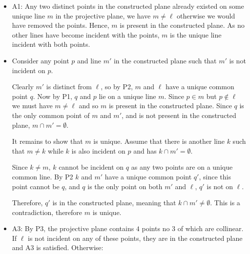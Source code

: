 \documentclass[a4paper, 11pt]{article}
\begin{document}
\begin{itemize}
	\item
		 A1: Any two distinct points in the constructed plane already existed on some unique line $m$ in the projective plane, we have $m\neq\ell$ otherwise we would have removed the points. Hence, $m$ is present in the constructed plane. As no other lines have become incident with the points, $m$ is the unique line incident with both points.  

	\item 
		Consider any point $p$ and line $m'$ in the constructed plane such that $m'$ is not incident on $p$. 

		Clearly $m'$ is distinct from $\ell$, so by P2, $m$ and $\ell$ have a unique common point $q$. Now by P1, $q$ and $p$ lie on a unique line $m$. Since $p\in m$ but $p\notin\ell$ we must have $m\neq\ell$ and so $m$ is present in the constructed plane. Since $q$ is the only common point of $m$ and $m'$, and is not present in the constructed plane, $m\cap m'=\emptyset$. 

		\begin{center}
		\end{center}

		It remains to show that $m$ is unique. Assume that there is another line $k$ such that $m\neq k$ while $k$ is also incident on $p$ and has $k\cap m'=\emptyset$.

		Since $k\neq m$, $k$ cannot be incident on $q$ as any two points are on a unique common line. By P2 $k$ and $m'$ have a unique common point $q'$, since this point cannot be $q$, and $q$ is the only point on both $m'$ and $\ell$, $q'$ is not on $\ell$. 

		Therefore, $q'$ is in the constructed plane, meaning that $k\cap m'\neq \emptyset$. This is a contradiction, therefore $m$ is unique. 
\pagebreak
	\item 
		A3: By P3, the projective plane contains $4$ points no $3$ of which are collinear. If $\ell$ is not incident on any of these points, they are in the constructed plane and A3 is satisfied. Otherwise: 
	

\end{itemize}
\end{document}
